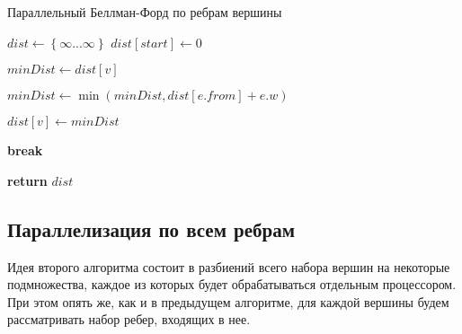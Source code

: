 \FloatBarrier
\begin{algorithm}
\caption{Параллельный Беллман-Форд по ребрам вершины}\label{bf_classic_par1}
\begin{algorithmic}[1]
\State $dist\gets \left\{ {\infty ... \infty}\right\}$
\State $dist[start] \gets 0$
 
		\algrenewcommand{}
		\State $minDist \gets dist[v]$

		  
			\State $minDist \gets \min(minDist, dist[e.from] + e.w)$
		\EndFor	
					
			\State $dist[v] \gets minDist$  

		\EndIf

		\algrenewcommand{}

	\EndFor
		\State \textbf{break}
	\EndIf

\EndFor
\State \textbf{return} $dist$
\EndProcedure
\end{algorithmic}
\end{algorithm}

\FloatBarrier
\subsection{Параллелизация по всем ребрам}
Идея второго алгоритма состоит в разбиений всего набора вершин на некоторые подмножества, каждое из которых будет обрабатываться отдельным процессором. При этом опять же, как и в предыдущем алгоритме, для каждой вершины будем рассматривать набор ребер, входящих в нее. 


